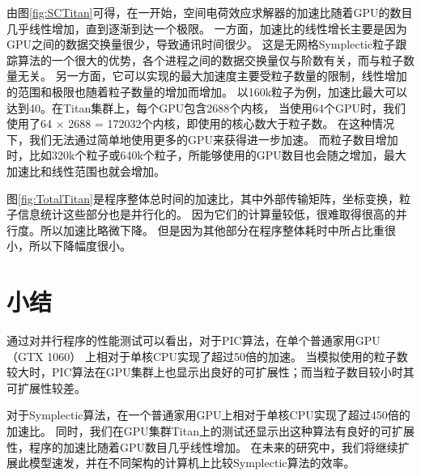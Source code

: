 由图\ref{fig:SCTitan}可得，在一开始，空间电荷效应求解器的加速比随着GPU的数目几乎线性增加，直到逐渐到达一个极限。
一方面，加速比的线性增长主要是因为GPU之间的数据交换量很少，导致通讯时间很少。
这是无网格Symplectic粒子跟踪算法的一个很大的优势，各个进程之间的数据交换量仅与阶数有关，而与粒子数量无关。
另一方面，它可以实现的最大加速度主要受粒子数量的限制，线性增加的范围和极限也随着粒子数量的增加而增加。
以160k粒子为例，加速比最大可以达到40。在Titan集群上，每个GPU包含2688个内核，
当使用64个GPU时，我们使用了64 $\times$ 2688 = 172032个内核，即使用的核心数大于粒子数。
在这种情况下，我们无法通过简单地使用更多的GPU来获得进一步加速。
而粒子数目增加时，比如320k个粒子或640k个粒子，所能够使用的GPU数目也会随之增加，最大加速比和线性范围也就会增加。

图\ref{fig:TotalTitan}是程序整体总时间的加速比，其中外部传输矩阵，坐标变换，粒子信息统计这些部分也是并行化的。
因为它们的计算量较低，很难取得很高的并行度。所以加速比略微下降。
但是因为其他部分在程序整体耗时中所占比重很小，所以下降幅度很小。

\section{小结}                      \label{section:Performance_conclusion}
通过对并行程序的性能测试可以看出，对于PIC算法，在单个普通家用GPU （GTX 1060） 上相对于单核CPU实现了超过50倍的加速。
当模拟使用的粒子数较大时，PIC算法在GPU集群上也显示出良好的可扩展性；而当粒子数目较小时其可扩展性较差。

对于Symplectic算法，在一个普通家用GPU上相对于单核CPU实现了超过450倍的加速比。
同时，我们在GPU集群Titan上的测试还显示出这种算法有良好的可扩展性，程序的加速比随着GPU数目几乎线性增加。
在未来的研究中，我们将继续扩展此模型速发，并在不同架构的计算机上比较Symplectic算法的效率。